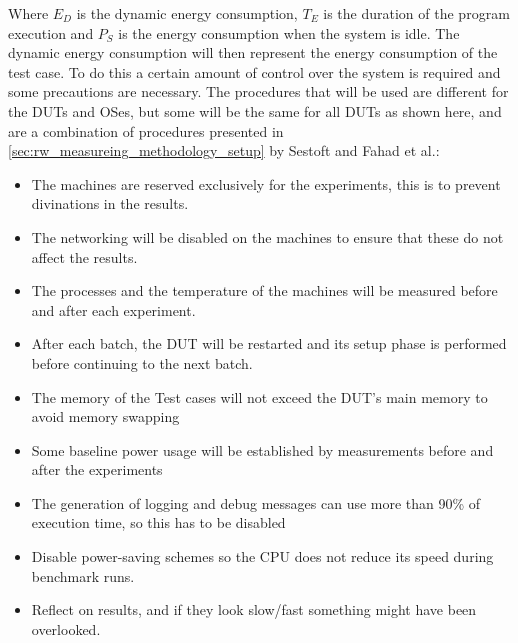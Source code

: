 Where $E_D$ is the dynamic energy consumption, $T_E$ is the duration of the program execution and $P_S$ is the energy consumption when the system is idle. The dynamic energy consumption will then represent the energy consumption of the test case. To do this a certain amount of control over the system is required and some precautions are necessary. The procedures that will be used are different for the DUTs and OSes, but some will be the same for all DUTs as shown here, and are a combination of procedures presented in \cref*{sec:rw_measureing_methodology_setup} by Sestoft\cite*[]{sestoft2013microbenchmarks} and Fahad et al.\cite*[]{fahad2019comparative}:

\begin{itemize}
    \item The machines are reserved exclusively for the experiments, this is to prevent divinations in the results.
    \item The networking will be disabled on the machines to ensure that these do not affect the results.
    \item The processes and the temperature of the machines will be measured before and after each experiment.
    \item After each batch, the DUT will be restarted and its setup phase is performed before continuing to the next batch.
    \item The memory of the Test cases will not exceed the DUT's main memory to avoid memory swapping
    \item Some baseline power usage will be established by measurements before and after the experiments
    \item The generation of logging and debug messages can use more than 90\% of execution time, so this has to be disabled
    \item Disable power-saving schemes so the CPU does not reduce its speed during benchmark runs.
    \item Reflect on results, and if they look slow/fast something might have been overlooked.
\end{itemize}

